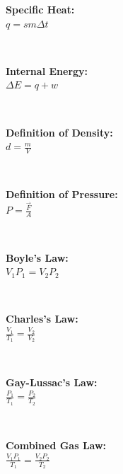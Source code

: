 
\begin{minipage}{\textwidth}
    \textbf{Specific Heat:}
    \\ \( q = sm \Delta t \)
\end{minipage}
\\ \begin{minipage}{\textwidth}
    \textbf{Internal Energy:}
    \\ \( \Delta E = q + w \)
\end{minipage}
\\ \begin{minipage}{\textwidth}
    \textbf{Definition of Density:}
    \\ \( d = \displaystyle\frac{ m }{ V } \)
\end{minipage}
\\ \begin{minipage}{\textwidth}
    \textbf{Definition of Pressure:}
    \\ \( P = \displaystyle\frac{ \vec{ F } }{ A } \)
\end{minipage}
\\ \begin{minipage}{\textwidth}
    \textbf{Boyle’s Law:}
    \\ \( V_1 P_1 = V_2 P_2 \)
\end{minipage}
\\ \begin{minipage}{\textwidth}
    \textbf{Charles's Law:}
    \\ \( \displaystyle\frac{ V_1 }{ T_1 } = \displaystyle\frac{ V_2 }{ V_2 } \)
\end{minipage}
\\ \begin{minipage}{\textwidth}
    \textbf{Gay-Lussac’s Law:}
    \\ \( \displaystyle\frac{ P_1 }{ T_1 } = \displaystyle\frac{ P_2 }{ T_2 } \)
\end{minipage}
\\ \begin{minipage}{\textwidth}
    \textbf{Combined Gas Law:}
    \\ \( \displaystyle\frac{ V_1 P_1 }{ T_1 } = \displaystyle\frac{ V_2 P_2 }{ T_2 } \)
\end{minipage}
